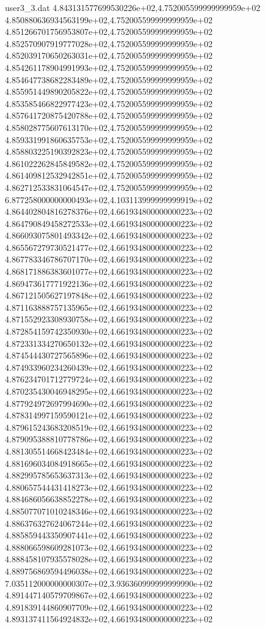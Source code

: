 \begin{filecontents}{user3_3.dat}
4.843131577699530226e+02,4.752005599999999959e+02
4.850880636934563199e+02,4.752005599999999959e+02
4.851266701756953807e+02,4.752005599999999959e+02
4.852570907919777028e+02,4.752005599999999959e+02
4.852039170650263031e+02,4.752005599999999959e+02
4.854261178904991993e+02,4.752005599999999959e+02
4.854647738682283489e+02,4.752005599999999959e+02
4.855951449890205822e+02,4.752005599999999959e+02
4.853585466822977423e+02,4.752005599999999959e+02
4.857641720875420788e+02,4.752005599999999959e+02
4.858028775607613170e+02,4.752005599999999959e+02
4.859331991860635753e+02,4.752005599999999959e+02
4.858803225190392823e+02,4.752005599999999959e+02
4.861022262845849582e+02,4.752005599999999959e+02
4.861409812532942851e+02,4.752005599999999959e+02
4.862712533831064547e+02,4.752005599999999959e+02
6.877258000000000493e+02,4.103113999999999919e+02
4.864402804816278376e+02,4.661934800000000223e+02
4.864790849458272533e+02,4.661934800000000223e+02
4.866093075801493342e+02,4.661934800000000223e+02
4.865567279730521477e+02,4.661934800000000223e+02
4.867783346786707170e+02,4.661934800000000223e+02
4.868171886383601077e+02,4.661934800000000223e+02
4.869473617771922136e+02,4.661934800000000223e+02
4.867121505627197848e+02,4.661934800000000223e+02
4.871163888757135965e+02,4.661934800000000223e+02
4.871552923308930758e+02,4.661934800000000223e+02
4.872854159742350930e+02,4.661934800000000223e+02
4.872331334270650132e+02,4.661934800000000223e+02
4.874544430727565896e+02,4.661934800000000223e+02
4.874933960234260439e+02,4.661934800000000223e+02
4.876234701712779724e+02,4.661934800000000223e+02
4.870235430046948295e+02,4.661934800000000223e+02
4.877924972697994690e+02,4.661934800000000223e+02
4.878314997159590121e+02,4.661934800000000223e+02
4.879615243683208519e+02,4.661934800000000223e+02
4.879095388810778786e+02,4.661934800000000223e+02
4.881305514668423484e+02,4.661934800000000223e+02
4.881696034084918665e+02,4.661934800000000223e+02
4.882995785653637313e+02,4.661934800000000223e+02
4.880657544431418273e+02,4.661934800000000223e+02
4.884686056638852278e+02,4.661934800000000223e+02
4.885077071010248346e+02,4.661934800000000223e+02
4.886376327624067244e+02,4.661934800000000223e+02
4.885859443350907441e+02,4.661934800000000223e+02
4.888066598609281073e+02,4.661934800000000223e+02
4.888458107935578028e+02,4.661934800000000223e+02
4.889756869594496038e+02,4.661934800000000223e+02
7.035112000000000307e+02,3.936360999999999990e+02
4.891447140579709867e+02,4.661934800000000223e+02
4.891839144860907709e+02,4.661934800000000223e+02
4.893137411564924832e+02,4.661934800000000223e+02

\end{filecontents}
